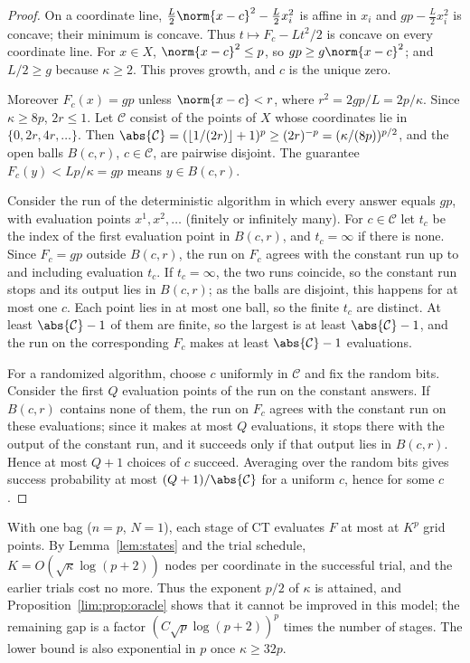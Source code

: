\begin{proof}
On a coordinate line, $\frac L2\norm{x-c}^2-\frac L2x_i^2$ is affine in
$x_i$ and $gp-\frac L2x_i^2$ is concave; their minimum is concave. Thus
$t\mapsto F_c-Lt^2/2$ is concave on every coordinate line. For $x\in X$,
$\norm{x-c}^2\le p$, so $gp\ge g\norm{x-c}^2$; and $L/2\ge g$ because
$\kappa\ge2$. This proves growth, and $c$ is the unique zero.

Moreover $F_c(x)=gp$ unless $\norm{x-c}<r$, where $r^2=2gp/L=2p/\kappa$.
Since $\kappa\ge8p$, $2r\le1$. Let $\mathcal C$ consist of the points of
$X$ whose coordinates lie in $\{0,2r,4r,\ldots\}$. Then
$\abs{\mathcal C}=(\lfloor1/(2r)\rfloor+1)^p\ge(2r)^{-p}=(\kappa/(8p))^{p/2}$,
and the open balls $B(c,r)$, $c\in\mathcal C$, are pairwise disjoint. The
guarantee $F_c(y)<Lp/\kappa=gp$ means $y\in B(c,r)$.

Consider the run of the deterministic algorithm in which every answer equals
$gp$, with evaluation points $x^1,x^2,\ldots$ (finitely or infinitely many).
For $c\in\mathcal C$ let $t_c$ be the index of the first evaluation point in
$B(c,r)$, and $t_c=\infty$ if there is none. Since $F_c=gp$ outside $B(c,r)$,
the run on $F_c$ agrees with the constant run up to and including evaluation
$t_c$. If $t_c=\infty$, the two runs coincide, so the constant run stops and
its output lies in $B(c,r)$; as the balls are disjoint, this happens for at
most one $c$. Each point lies in at most one ball, so the finite $t_c$ are
distinct. At least $\abs{\mathcal C}-1$ of them are finite, so the largest
is at least $\abs{\mathcal C}-1$, and the run on the corresponding $F_c$
makes at least $\abs{\mathcal C}-1$ evaluations.

For a randomized algorithm, choose $c$ uniformly in $\mathcal C$ and fix the
random bits. Consider the first $Q$ evaluation points of the run on the
constant answers. If $B(c,r)$ contains none of them, the run on $F_c$ agrees
with the constant run on these evaluations; since it makes at most $Q$
evaluations, it stops there with the output of the constant run, and it
succeeds only if that output lies in $B(c,r)$. Hence at most $Q+1$ choices of
$c$ succeed. Averaging over the random bits gives success probability at most
$(Q+1)/\abs{\mathcal C}$ for a uniform $c$, hence for some $c$.
\end{proof}

\begin{remark}\label{lim:rem:oracle}
With one bag ($n=p$, $N=1$), each stage of CT evaluates $F$ at most at
$K^p$ grid points. By Lemma~\ref{lem:states} and the trial schedule,
$K=O(\sqrt\kappa\log(p+2))$ nodes per coordinate in the successful trial,
and the earlier trials cost no more. Thus the exponent $p/2$ of $\kappa$ is
attained, and Proposition~\ref{lim:prop:oracle} shows that it cannot be
improved in this model; the remaining gap is a factor
$(C\sqrt p\log(p+2))^p$ times the number of stages. The lower bound is also
exponential in $p$ once $\kappa\ge32p$.
\end{remark}

